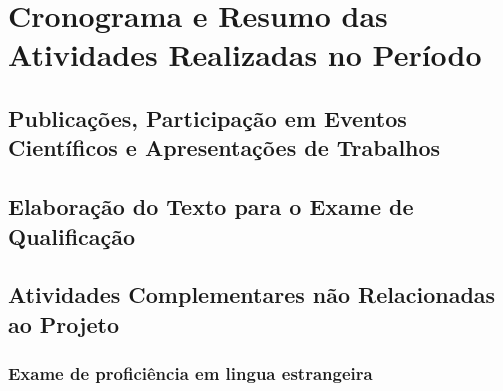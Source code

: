 \documentclass[a4paper,11pt]{article}
\begin{document}
\section{Cronograma e Resumo das Atividades Realizadas no Período}\label{cronograma}



 	 
	 

	 \subsection{Publicações, Participação em Eventos Científicos e Apresentações de Trabalhos} %
	 \label{sub:publica_es_participa_o_em_eventos_cient_ficos_e_apresenta_es_de_trabalhos}
	 
	 	

	 \subsection{Elaboração do Texto para o Exame de Qualificação} %
	 \label{sub:elabora_o_do_texto_para_o_exame_de_qualifica_o}
	 
	 	


	 \subsection{Atividades Complementares não Relacionadas ao Projeto} %
	 \label{sub:atividades_complementares_n_o_relacionadas_ao_projeto}
	 
	 

	 \subsubsection{Exame de proficiência em lingua estrangeira} %
	 \label{sub:exame_de_profici_ncia_em_lingua_estrangeira}
	 
\end{document}
